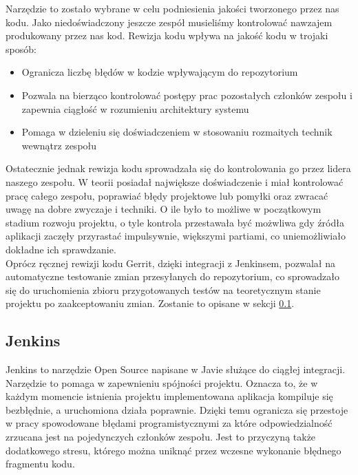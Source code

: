 \documentclass[licencjacka]{pracamgr}
\begin{document}
Narzędzie to zostało wybrane w celu podniesienia jakości tworzonego przez nas kodu. Jako niedoświadczony jeszcze zespół musieliśmy kontrolować nawzajem produkowany przez nas kod. Rewizja kodu wpływa na jakość kodu w trojaki sposób:
\begin{itemize}
\item Ogranicza liczbę błędów w kodzie wpływającym do repozytorium
\item Pozwala na bierząco kontrolować postępy prac pozostałych członków zespołu i zapewnia ciągłość w rozumieniu architektury systemu
\item Pomaga w dzieleniu się doświadczeniem w stosowaniu rozmaitych technik wewnątrz zespołu
\end{itemize}

Ostatecznie jednak rewizja kodu sprowadzała się do kontrolowania go przez lidera naszego zespołu. W teorii posiadał największe doświadczenie i miał kontrolować pracę całego zespołu, poprawiać błędy projektowe lub pomyłki oraz zwracać uwagę na dobre zwyczaje i techniki. O ile było to możliwe w początkowym stadium rozwoju projektu, o tyle kontrola przestawała być możwliwa gdy źródła aplikacji zaczęły przyrastać impulsywnie, większymi partiami, co uniemożliwiało dokładne ich sprawdzanie. \\

Oprócz ręcznej rewizji kodu Gerrit, dzięki integracji z Jenkinsem, pozwalał na automatyczne testowanie zmian przesyłanych do repozytorium, co sprowadzało się do uruchomienia zbioru przygotowanych testów na teoretycznym stanie projektu po zaakceptowaniu zmian. Zostanie to opisane w sekcji \ref{r:jenkins}.

\subsection{Jenkins}\label{r:jenkins}
Jenkins to narzędzie Open Source napisane w Javie służące do ciągłej integracji. Narzędzie to pomaga w zapewnieniu spójności projektu. Oznacza to, że w każdym momencie istnienia projektu implementowana aplikacja kompiluje się bezbłędnie, a uruchomiona działa poprawnie. Dzięki temu ogranicza się przestoje w pracy spowodowane błędami programistycznymi za które odpowiedzialność zrzucana jest na pojedynczych członków zespołu. Jest to przyczyną także dodatkowego stresu, którego można uniknąć przez wczesne wykonanie błędnego fragmentu kodu.
\end{document}
